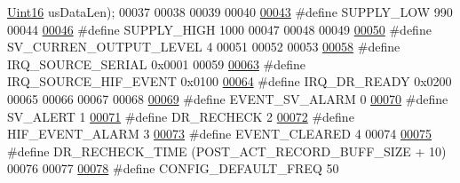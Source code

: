 \begin{DoxyCode}
      \hyperlink{a00072_a59a9f6be4562c327cbfb4f7e8e18f08b}{Uint16} usDataLen);
00037 
00038 
00039 
00040 
\hypertarget{a00021_source_l00043}{}\hyperlink{a00021_a7c28268c9463a51a0f1e27d3ac941c12}{00043} \textcolor{preprocessor}{#define SUPPLY\_LOW                                              990}
00044 
\hypertarget{a00021_source_l00046}{}\hyperlink{a00021_a338142762317568b3b258e83442c2986}{00046} \textcolor{preprocessor}{#define SUPPLY\_HIGH                                             1000}
00047 
00048 
00049 
\hypertarget{a00021_source_l00050}{}\hyperlink{a00021_a648a6327bd26d3d2f537bbea230c6ffb}{00050} \textcolor{preprocessor}{#define SV\_CURREN\_OUTPUT\_LEVEL                                  4}
00051 
00052 
00053 
\hypertarget{a00021_source_l00058}{}\hyperlink{a00021_a286de80383de54438b3e38d9f149dfd0}{00058} \textcolor{preprocessor}{#define IRQ\_SOURCE\_SERIAL                                       0x0001}
00059 
\hypertarget{a00021_source_l00063}{}\hyperlink{a00021_a51725fc3a4c26625f15db1274791d961}{00063} \textcolor{preprocessor}{#define IRQ\_SOURCE\_HIF\_EVENT                                    0x0100}
\hypertarget{a00021_source_l00064}{}\hyperlink{a00021_acfd80444497090bce928df199247a0ec}{00064} \textcolor{preprocessor}{#define IRQ\_DR\_READY                                            0x0200}
00065 
00066 
00067 
00068 
\hypertarget{a00021_source_l00069}{}\hyperlink{a00021_a0cec8cae6d70499e62b4251e5843497d}{00069} \textcolor{preprocessor}{#define EVENT\_SV\_ALARM                                          0}
\hypertarget{a00021_source_l00070}{}\hyperlink{a00021_af66e399e9c5b681f0c1468708a6c9d38}{00070} \textcolor{preprocessor}{#define SV\_ALERT                                                1}
\hypertarget{a00021_source_l00071}{}\hyperlink{a00021_a6e67f9a00e51668436c0395616f43e88}{00071} \textcolor{preprocessor}{#define DR\_RECHECK                                              2}
\hypertarget{a00021_source_l00072}{}\hyperlink{a00021_aab5d5969b3cff6fd6cd4a7e2cbbc139d}{00072} \textcolor{preprocessor}{#define HIF\_EVENT\_ALARM                                         3}
\hypertarget{a00021_source_l00073}{}\hyperlink{a00021_a602c125746b241f3a37e9fd5f43412b0}{00073} \textcolor{preprocessor}{#define EVENT\_CLEARED                                           4}
00074 
\hypertarget{a00021_source_l00075}{}\hyperlink{a00021_afb154043998a164232751d1c030e8650}{00075} \textcolor{preprocessor}{#define DR\_RECHECK\_TIME                                         (POST\_ACT\_RECORD\_BUFF\_SIZE + 10)}
00076 
00077 
\hypertarget{a00021_source_l00078}{}\hyperlink{a00021_a985a153b3edd3d7d638137ae0b9e5e67}{00078} \textcolor{preprocessor}{#define CONFIG\_DEFAULT\_FREQ                                     50}

\end{DoxyCode}
